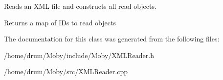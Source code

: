 Reads an X\-M\-L file and constructs all read objects. 

\begin{DoxyReturn}{Returns}
a map of I\-Ds to read objects 
\end{DoxyReturn}


The documentation for this class was generated from the following files\-:\begin{DoxyCompactItemize}
\item 
/home/drum/\-Moby/include/\-Moby/X\-M\-L\-Reader.\-h\item 
/home/drum/\-Moby/src/X\-M\-L\-Reader.\-cpp\end{DoxyCompactItemize}
